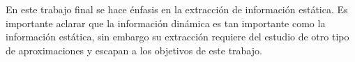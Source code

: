 \documentclass[a4paper,12pt]{report}
\begin{document}
%
%
% 
%







En este trabajo final se hace énfasis en la extracción de información estática. Es importante aclarar que la información dinámica es tan importante como la información estática, sin embargo su extracción requiere del estudio de otro tipo de aproximaciones y escapan a los objetivos de este trabajo.
\end{document}
